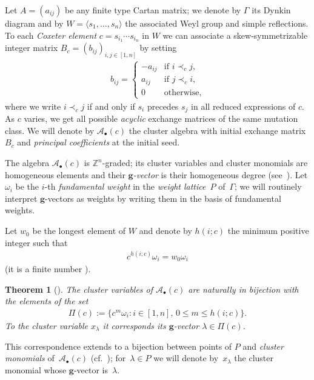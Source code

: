 \documentclass[pdftex]{sigma}
\numberwithin{equation}{section}
\newtheorem{Theorem}{Theorem}[section]
\newcommand{\cA}{\mathcal{A}}
\newcommand{\ZZ}{\mathbb{Z}}
\newcommand{\bg}{\mathbf{g}}
\begin{document}
  Let $A=(a_{ij})$ be any f\/inite type Cartan matrix; we denote by $\Gamma$ its Dynkin diagram and by $W=\langle s_1,\dots,s_n\rangle$ the associated Weyl group and simple ref\/lections.
  To each \emph{Coxeter element} $c=s_{i_1}\cdots s_{i_n}$ in $W$ we can associate a skew-symmetrizable integer matrix $B_c=(b_{ij})_{i,j\in[1,n]}$ by setting
  \begin{gather*}
    b_{ij}=
    \begin{cases}
      -a_{ij} & \text{if } i\prec_c j, \\
      a_{ij} & \text{if } j\prec_c i, \\
      0 & \text{otherwise},
    \end{cases}
  \end{gather*}
  where we write $i\prec_c j$ if and only if $s_i$ precedes $s_j$ in all reduced expressions of $c$.
  As $c$ varies, we get all possible \emph{acyclic} exchange matrices of the same mutation class.
  We will denote by $\cA_\bullet(c)$ the cluster algebra with initial exchange matrix $B_c$ and \emph{principal coefficients} at the initial seed.

  The algebra $\cA_\bullet(c)$ is $\ZZ^n$-graded; its cluster variables and cluster monomials are homogeneous elements and their \emph{$\bg$-vector} is their homogeneous degree (see~\cite[Section~6]{FZ07}).
  Let $\omega_i$ be the $i$-th \emph{fundamental weight} in the \emph{weight lattice}~$P$ of~$\Gamma$; we will routinely interpret $\bg$-vectors as weights by writing them in the basis of fundamental weights.

  Let $w_0$ be the longest element of $W$ and denote by $h(i;c)$ the minimum positive integer such that
  \begin{gather*}
    c^{h(i;c)}\omega_i = w_0\omega_i
  \end{gather*}
  (it is a f\/inite number \cite[Proposition~1.3]{YZ08}).
  \begin{Theorem}[{\cite[Theorem~1.4]{YZ08}}]
    The cluster variables of $\cA_\bullet(c)$ are naturally in bijection with the elements of the set
    \begin{gather*}
      \Pi(c) := \big\{ c^m\omega_i \colon i\in[1,n] , \, 0\leq m \leq h(i;c) \big\}.
    \end{gather*}
    To the cluster variable $x_\lambda$ it corresponds its $\bg$-vector $\lambda\in\Pi(c)$.
  \end{Theorem}

  This correspondence extends to a bijection between points of $P$ and \emph{cluster monomials} of~$\cA_\bullet(c)$ (cf.~\cite[Theorem~1.2]{Ste13}); for~$\lambda\in P$ we will denote by~$x_\lambda$ the cluster monomial whose $\bg$-vector is~$\lambda$.
\end{document}
